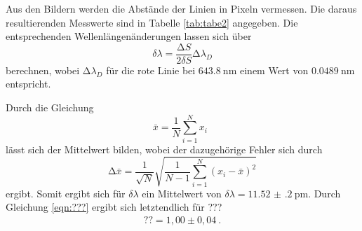 Aus den Bildern werden die Abstände der Linien in Pixeln vermessen. Die daraus resultierenden Messwerte sind
in Tabelle \ref{tab:tabe2} angegeben. Die entsprechenden Wellenlängenänderungen lassen sich über
\begin{equation}
  \delta \lambda = \frac{\increment S}{2 \delta S} \increment \lambda_D
\end{equation}
berechnen, wobei $\increment \lambda_D$ für die rote Linie bei $\SI{643.8}{\nano\meter}$
einem Wert von $\SI{0.0489}{\nano\meter}$ entspricht.

Durch die Gleichung
\begin{equation}
  \bar{x} = \frac{1}{N} \sum_{i=1}^{N} x_i \: \:
  \label{eqn:mit}
\end{equation}
\noindent lässt sich der Mittelwert bilden, wobei der dazugehörige Fehler sich durch
\begin{equation}
  \increment \bar{x} = \frac{1}{\sqrt{N}} \sqrt{ \frac{1}{N-1} \sum_{i=1}^N
  (x_i - \bar{x})^2}
  \label{eqn:mitf}
\end{equation}
ergibt. Somit ergibt sich für $\delta \lambda$ ein Mittelwert von
$ \delta \lambda = \SI{11.52(20)}{\pico\meter} $.
Durch Gleichung \ref{eqn:???} ergibt sich letztendlich für ???
\begin{align*}
??=1,00 \pm 0,04 \: .
\end{align*}

